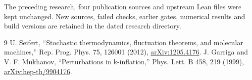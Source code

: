 \documentclass[11pt]{article}
\begin{document}
The preceding research, four publication sources and upstream Lean files
were kept unchanged. New sources, failed checks, earlier gates, numerical
results and build versions are retained in the dated research directory.

\begin{thebibliography}{9}
 U. Seifert, ``Stochastic thermodynamics, fluctuation theorems,
and molecular machines,'' Rep. Prog. Phys. 75, 126001 (2012),
\href{https://arxiv.org/abs/1205.4176}{arXiv:1205.4176}.
 J. Garriga and V. F. Mukhanov, ``Perturbations in k-inflation,''
Phys. Lett. B 458, 219 (1999),
\href{https://arxiv.org/abs/hep-th/9904176}{arXiv:hep-th/9904176}.
\end{thebibliography}
\end{document}
